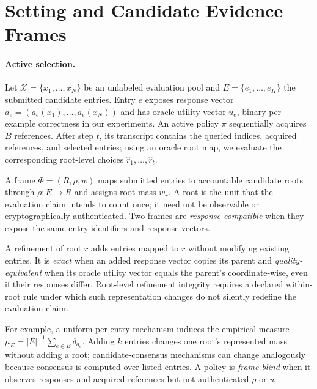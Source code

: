 \section{Setting and Candidate Evidence Frames}
\label{sec:setting}

\paragraph{Active selection.}
Let $\mathcal{X}=\{x_1,\ldots,x_N\}$ be an unlabeled evaluation pool and $E=\{e_1,\ldots,e_H\}$ the submitted candidate entries. Entry $e$ exposes response vector $a_e=(a_e(x_1),\ldots,a_e(x_N))$ and has oracle utility vector $u_e$, binary per-example correctness in our experiments. An active policy $\pi$ sequentially acquires $B$ references. After step $t$, its transcript contains the queried indices, acquired references, and selected entries; using an oracle root map, we evaluate the corresponding root-level choices $\widehat r_1,\ldots,\widehat r_t$.

\begin{definition}
A frame $\Phi=(R,\rho,w)$ maps submitted entries to accountable candidate roots through $\rho:E\rightarrow R$ and assigns root mass $w_r$. A root is the unit that the evaluation claim intends to count once; it need not be observable or cryptographically authenticated. Two frames are \emph{response-compatible} when they expose the same entry identifiers and response vectors.
\end{definition}

\begin{definition}
A refinement of root $r$ adds entries mapped to $r$ without modifying existing entries. It is \emph{exact} when an added response vector copies its parent and \emph{quality-equivalent} when its oracle utility vector equals the parent's coordinate-wise, even if their responses differ. Root-level refinement integrity requires a declared within-root rule under which such representation changes do not silently redefine the evaluation claim.
\end{definition}

For example, a uniform per-entry mechanism induces the empirical measure $\mu_E=|E|^{-1}\sum_{e\in E}\delta_{a_e}$. Adding $k$ entries changes one root's represented mass without adding a root; candidate-consensus mechanisms can change analogously because consensus is computed over listed entries. A policy is \emph{frame-blind} when it observes responses and acquired references but not authenticated $\rho$ or $w$.

